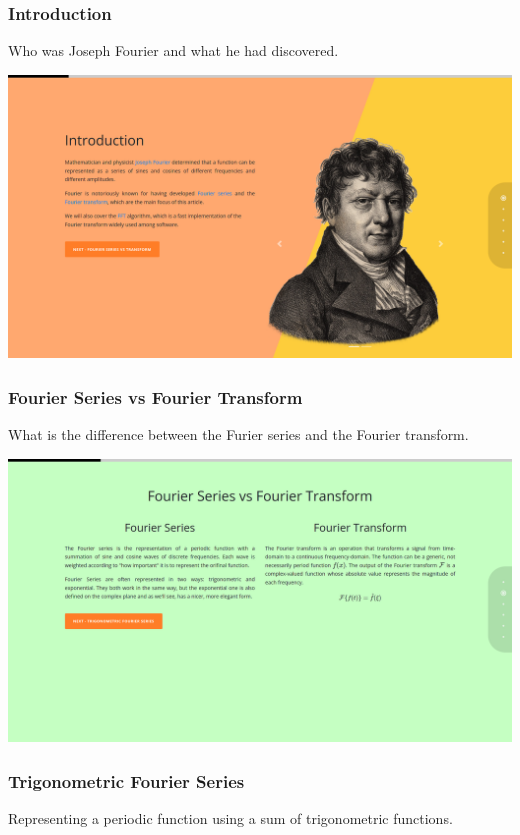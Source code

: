 \documentclass{article}
\begin{document}
\subsubsection{Introduction}

Who was Joseph Fourier and what he had discovered.

\includegraphics[width=\textwidth]{chap3.png}

\subsubsection{Fourier Series vs Fourier Transform}

What is the difference between the Furier series and the Fourier transform.

\includegraphics[width=\textwidth]{chap4.png}

\subsubsection{Trigonometric Fourier Series}

Representing a periodic function using a sum of trigonometric functions.
\end{document}
